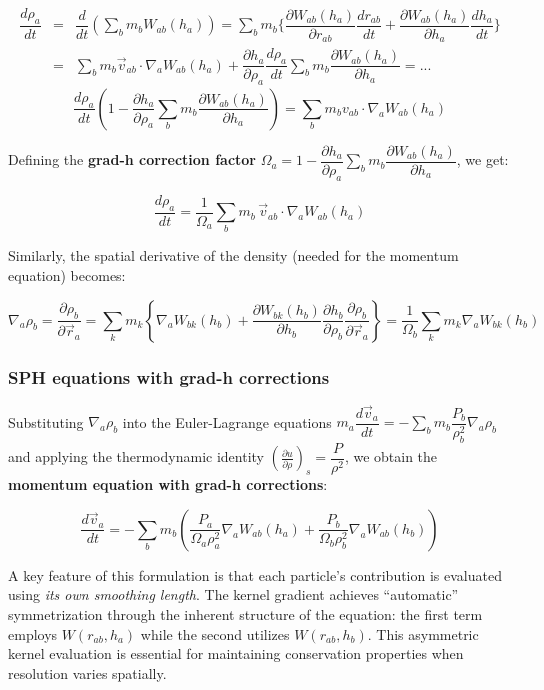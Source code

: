 $$
\begin{array}{rcl}
\dfrac{d\rho_a}{dt} &=& \displaystyle \dfrac{d}{dt} \left( \sum_b m_b W_{ab}(h_a) \right)
= \sum_b m_b \bigg\{ \dfrac{\partial W_{ab}(h_a)}{\partial r_{ab}} \dfrac{dr_{ab}}{dt} + \dfrac{\partial W_{ab}(h_a)}{\partial h_a} \dfrac{dh_a}{dt}\bigg\}\\[0.7em]
&=& \displaystyle \sum_b m_b \vec{v}_{ab} \cdot \nabla_a W_{ab}(h_a) + \dfrac{\partial h_a}{\partial \rho_a} \dfrac{d\rho_a}{dt} \sum_b m_b \dfrac{\partial W_{ab}(h_a)}{\partial h_a} = ...
\end{array}
$$
$$
\dfrac{d\rho_a}{dt} \left( 1 - \dfrac{\partial h_a}{\partial \rho_a} \sum_b m_b \dfrac{\partial W_{ab}(h_a)}{\partial h_a} \right) = \sum_b m_b v_{ab} \cdot \nabla_a W_{ab}(h_a)
$$

Defining the \textbf{grad-h correction factor} $
\Omega_a = 1 - \dfrac{\partial h_a}{\partial \rho_a} \sum_b m_b \dfrac{\partial W_{ab}(h_a)}{\partial h_a}
$, we get:

$$
\boxed{
\dfrac{d\rho_a}{dt} = \dfrac{1}{\Omega_a} \sum_b m_b \, \vec{v}_{ab} \cdot \nabla_a W_{ab}(h_a)
}
$$

Similarly, the spatial derivative of the density (needed for the momentum equation) becomes:

$$
\nabla_a \rho_b = \dfrac{\partial \rho_b}{\partial \vec{r}_a} 
= \sum_k m_k \left\{ \nabla_a W_{bk}(h_b) + \dfrac{\partial W_{bk}(h_b)}{\partial h_b} \dfrac{\partial h_b}{\partial \rho_b} \dfrac{\partial \rho_b}{\partial \vec{r}_a}\right\}
= \dfrac{1}{\Omega_b} \sum_k m_k \nabla_a W_{bk}(h_b)
$$

\subsubsection{SPH equations with grad-h corrections}

Substituting $\nabla_a \rho_b$ into the Euler-Lagrange equations $m_a \dfrac{d\vec{v}_a}{dt} = -\sum_b m_b \dfrac{P_b}{\rho_b^2} \nabla_a \rho_b$ and applying the thermodynamic identity $\left( \frac{\partial u}{\partial \rho} \right)_s = \dfrac{P}{\rho^2}$, we obtain the \textbf{momentum equation with grad-h corrections}:

$$
\boxed{
\dfrac{d\vec{v}_a}{dt} = -\sum_b m_b \left( \dfrac{P_a}{\Omega_a \rho_a^2} \nabla_a W_{ab}(h_a) + \dfrac{P_b}{\Omega_b \rho_b^2} \nabla_a W_{ab}(h_b) \right)
}
$$

A key feature of this formulation is that each particle's contribution is evaluated using \textit{its own smoothing length}. The kernel gradient achieves ``automatic'' symmetrization through the inherent structure of the equation: the first term employs $W(r_{ab}, h_a)$ while the second utilizes $W(r_{ab}, h_b)$. This asymmetric kernel evaluation is essential for maintaining conservation properties when resolution varies spatially.

